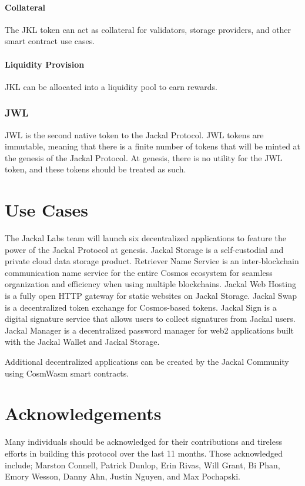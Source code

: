 \documentclass[a4paper]{article}
\begin{document}
\paragraph{Collateral}
The JKL token can act as collateral for validators, storage providers, and other smart contract use cases. 

\paragraph{Liquidity Provision}
JKL can be allocated into a liquidity pool to earn rewards. 

\subsubsection{JWL}
JWL is the second native token to the Jackal Protocol. JWL tokens are immutable, meaning that there is a finite number of tokens that will be minted at the genesis of the Jackal Protocol. At genesis, there is no utility for the JWL token, and these tokens should be treated as such. 

\section{Use Cases}
The Jackal Labs team will launch six decentralized applications to feature the power of the Jackal Protocol at genesis. Jackal Storage is a self-custodial and private cloud data storage product. Retriever Name Service is an inter-blockchain communication name service for the entire Cosmos ecosystem for seamless organization and efficiency when using multiple blockchains. Jackal Web Hosting is a fully open HTTP gateway for static websites on Jackal Storage. Jackal Swap is a decentralized token exchange for Cosmos-based tokens. Jackal Sign is a digital signature service that allows users to collect signatures from Jackal users. Jackal Manager is a decentralized password manager for web2 applications built with the Jackal Wallet and Jackal Storage. 

Additional decentralized applications can be created by the Jackal Community using CosmWasm smart contracts. 

\section{Acknowledgements}
Many individuals should be acknowledged for their contributions and tireless efforts in building this protocol over the last 11 months. Those acknowledged include; Marston Connell, Patrick Dunlop, Erin Rivas, Will Grant, Bi Phan, Emory Wesson, Danny Ahn, Justin Nguyen, and Max Pochapski. 

\newpage
\printbibliography %
\end{document}
